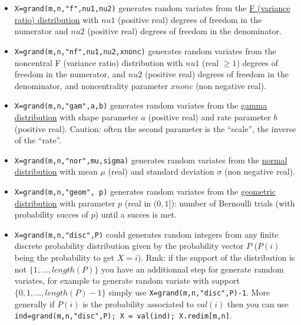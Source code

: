 \begin{enumerate}
\begin{itemize}
\item {} 
  \verb!X=grand(m,n,"f",nu1,nu2)! generates random variates from the \hyperlink{fpdf}{F 
  (variance ratio) distribution} with $nu1$ (positive real)
  degrees of freedom in the numerator and $nu2$ (positive real) 
  degrees of freedom in the denominator. 
  
\item {} 
  \verb!X=grand(m,n,"nf",nu1,nu2,xnonc)! generates random variates from the noncentral 
  F (variance ratio)  distribution with $nu1$ (real $\ge 1$) degrees of freedom 
  in the numerator, and $nu2$ (positive real) degrees of freedom in the denominator, 
  and noncentrality parameter $xnonc$ (non negative real). 
  
\item {} \verb!X=grand(m,n,"gam",a,b)! generates random variates from the  \hyperlink{gampdf}{gamma 
  distribution} with shape parameter $a$ (positive real) and rate
  parameter $b$ (positive real). Caution: often the second parameter
  is the ``scale'', the inverse of the ``rate''.  
  
\item {} 
  \verb!X=grand(m,n,"nor",mu,sigma)! generates random variates from the \hyperlink{norpdf}{normal 
  distribution} with mean $\mu$ (real)  and standard deviation $\sigma$
  (non negative real). 
  
\item {} \verb!X=grand(m,n,"geom", p)! generates random variates from the \hyperlink{geompdf}{geometric
  distribution} with parameter $p$ (real in $(0,1]$): number of Bernoulli trials (with 
  probability succes of $p$) until a succes is met.

\item {} 
  \verb!X=grand(m,n,"disc",P)! could generates random integers from any
  finite discrete probability distribution given by the probability
  vector $P$ ($P(i)$ being the probability to get $X=i$). Rmk: if the 
  support of the distribution is not $\{1,\dots,length(P)\}$ you have
  an additionnal step for generate ramdom variates, for example to
  generate random variate with support  $\{0,1,\dots,length(P)-1\}$
  simply use \verb!X=grand(m,n,"disc",P)-1!. More generally if $P(i)$ is
  the probability associated to $val(i)$ then you can use 
  \verb!ind=grand(m,n,"disc",P); X = val(ind); X.redim[m,n]!. 
  

\end{itemize}
\end{enumerate}
